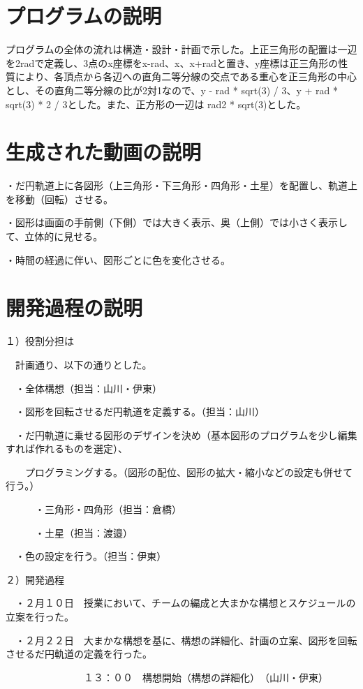 \documentclass[12pt,a4j]{jarticle}
\begin{document}
\section{プログラムの説明}

プログラムの全体の流れは構造・設計・計画で示した。上正三角形の配置は一辺を2radで定義し、3点のx座標をx-rad、x、x+radと置き、y座標は正三角形の性質により、各頂点から各辺への直角二等分線の交点である重心を正三角形の中心とし、その直角二等分線の比が2対1なので、y - rad * sqrt(3) / 3、y + rad * sqrt(3) * 2 / 3とした。また、正方形の一辺は rad2 * sqrt(3)とした。

\section{生成された動画の説明} 

・だ円軌道上に各図形（上三角形・下三角形・四角形・土星）を配置し、軌道上を移動（回転）させる。

・図形は画面の手前側（下側）では大きく表示、奥（上側）では小さく表示して、立体的に見せる。

・時間の経過に伴い、図形ごとに色を変化させる。


\section{開発過程の説明}

１）役割分担は

　計画通り、以下の通りとした。
 
　・全体構想（担当：山川・伊東）
 
　・図形を回転させるだ円軌道を定義する。（担当：山川）
 
　・だ円軌道に乗せる図形のデザインを決め（基本図形のプログラムを少し編集すれば作れるものを選定）、
 
　　プログラミングする。（図形の配位、図形の拡大・縮小などの設定も併せて行う。）
  
　　　・三角形・四角形（担当：倉橋）
   
　　　・土星（担当：渡邉）
   
　・色の設定を行う。（担当：伊東）

２）開発過程

　・２月１０日　授業において、チームの編成と大まかな構想とスケジュールの立案を行った。
 
　・２月２２日　大まかな構想を基に、構想の詳細化、計画の立案、図形を回転させるだ円軌道の定義を行った。
 
　　　　　　　　１３：００　構想開始（構想の詳細化）　（山川・伊東）
        
\end{document}
